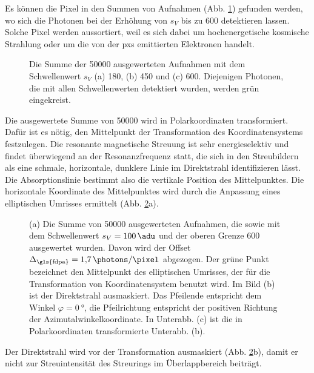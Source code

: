 \noindent
Es können die Pixel in den Summen von Aufnahmen (Abb. \ref{fig:th_180_450_600}) gefunden werden, wo sich die Photonen bei der Erhöhung von $s_V$ bis zu \SI{600}{\adu} detektieren lassen. Solche Pixel werden aussortiert, weil es sich dabei um hochenergetische kosmische Strahlung oder um die von der \gls{pxs} emittierten Elektronen handelt.
\begin{figure}[H]
    \centering
    
    \caption{Die Summe der \num{50000} ausgewerteten Aufnahmen mit dem Schwellenwert $s_V$ (a) \SI{180}{\adu}, (b) \SI{450}{\adu} und (c) \SI{600}{\adu}. Diejenigen Photonen, die mit allen Schwellenwerten detektiert wurden, werden grün eingekreist.}
    \label{fig:th_180_450_600}
\end{figure}
\noindent
Die ausgewertete Summe von \SI{50000}{\captures} wird in Polarkoordinaten transformiert. Dafür ist es nötig, den Mittelpunkt der Transformation des Koordinatensystems festzulegen. Die resonante magnetische Streuung ist sehr energieselektiv und findet überwiegend an der Resonanzfrequenz statt, die sich in den Streubildern als eine schmale, horizontale, dunklere Linie im Direktstrahl identifizieren lässt. Die Absorptionslinie bestimmt also die vertikale Position des Mittelpunktes. Die horizontale Koordinate des Mittelpunktes wird durch die Anpassung eines elliptischen Umrisses ermittelt (Abb. \ref{fig:th-100-200-maske-radial-transform}a).
\begin{figure}[H]
    \centering
    
    \caption{(a) Die Summe von \num{50000} ausgewerteten Aufnahmen, die sowie mit dem Schwellenwert $s_V = \SI{100}{\adu}$ und der oberen Grenze \SI{600}{\adu} ausgewertet wurden. Davon wird der Offset $\Delta_\text{\gls{fdpa}} = \SI[per-mode = symbol]{1,7}{\photons\per\pixel}$ abgezogen. Der grüne Punkt bezeichnet den Mittelpunkt des elliptischen Umrisses, der für die Transformation von Koordinatensystem benutzt wird. Im Bild (b) ist der Direktstrahl ausmaskiert. Das Pfeilende entspricht dem Winkel $\varphi = \SI{0}{\degree}$, die Pfeilrichtung entspricht der positiven Richtung der Azimutalwinkelkoordinate. In Unterabb. (c) ist die in Polarkoordinaten transformierte Unterabb. (b).}
    \label{fig:th-100-200-maske-radial-transform}
\end{figure}
\noindent
Der Direktstrahl wird vor der Transformation ausmaskiert (Abb. \ref{fig:th-100-200-maske-radial-transform}b), damit er nicht zur Streuintensität des Streurings im Überlappbereich beiträgt.

